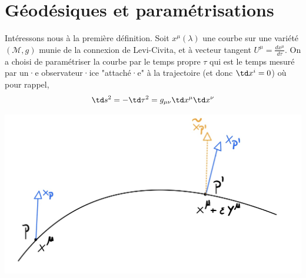 \section{Géodésiques et paramétrisations}
Intéressons nous à la première définition. Soit $x^{\mu}(\lambda)$ une courbe sur une variété $(\mathcal{M}, g)$ munie de la connexion de Levi-Civita, et à vecteur tangent $U^{\mu} = \frac{dx^{\mu}}{d\tau}$. On a choisi de paramétriser la courbe par le temps propre $\tau$ qui est le temps mesuré par un·e observateur·ice "attaché·e" à la trajectoire (et donc $\td x^{i} = 0$) où pour rappel,
\begin{equation}
    \td s^2 = -\td\tau ^2 = g_{\mu \nu}\td x^{\mu}\td x^{\nu}
\end{equation}

\begin{center} \includegraphics[scale=0.15]{Chapitres/5. Géodésiques/Images/transport parallèle.jpg} 
\end{center}


